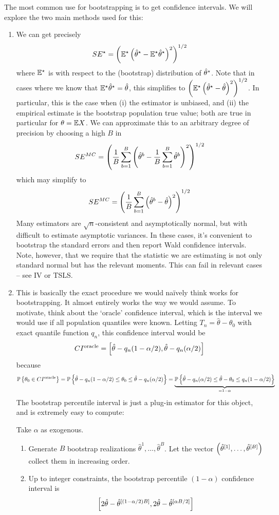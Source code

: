 \documentclass[10pt]{article}
\begin{document}
\begin{example}
	The most common use for bootstrapping is to get confidence intervals. We will explore the two main methods used for this:
	\begin{enumerate}
		\item {} We can get precisely \[SE^\star = \left( \mathbb{E}^\star\left( \hat{\theta}^\star - \mathbb{E}^\star  \hat{\theta}^\star\right)^2\right)^{1/2}\]where $\mathbb{E}^\star$ is with respect to the (bootstrap) distribution of $\hat{\theta}^\star$. Note that in cases where we know that $\mathbb{E}^\star\hat{\theta}^\star = \hat{\theta}$, this simplifies to $\left( \mathbb{E}^\star\left( \hat{\theta}^\star - \hat{\theta}\right)^2\right)^{1/2}$. In particular, this is the case when (i) the estimator is unbiased, and (ii) the empirical estimate is the bootstrap population true value; both are true in particular for $\theta = \mathbb{E} X$. We can approximate this to an arbitrary degree of precision by choosing a high $B$ in \[SE^{MC} = \left( \frac{1}{B}\sum_{b=1}^B \left( \hat{\theta}^b - \frac{1}{B}\sum_{b=1}^B \hat{\theta}^b\right)^2\right)^{1/2}\]which may simplify to \[SE^{MC} = \left( \frac{1}{B}\sum_{b=1}^B \left( \hat{\theta}^b - \hat{\theta}\right)^2\right)^{1/2}\]Many estimators are $\sqrt{n}$-consistent and asymptotically normal, but with difficult to estimate asymptotic variances. In these cases, it's convenient to bootstrap the standard errors and then report Wald confidence intervals. Note, however, that we require that the statistic we are estimating is not only standard normal but has the relevant moments. This can fail in relevant cases -- see IV or TSLS.
		\item {} This is basically the exact procedure we would na\"{i}vely think works for bootstrapping. It almost entirely works the way we would assume. To motivate, think about the `oracle' confidence interval, which is the interval we would use if all population quantiles were known. Letting $T_n = \hat{\theta}-\theta_0$ with exact quantile function $q_n$, this confidence interval would be \[CI^{\text{oracle}} = \left[ \hat{\theta}- q_n(1-\alpha/2),\hat{\theta} - q_n(\alpha / 2)\right]\]because\[\mathbb{P}\left\{\theta_0 \in CI^\text{oracle}\right\} = \mathbb{P}\left\{ \hat{\theta} - q_n(1-\alpha/2) \le \theta_0 \le \hat{\theta} - q_n(\alpha / 2)\right\} = \underbrace{\mathbb{P}\left\{ \hat{\theta} - q_n(\alpha/2) \le \hat{\theta}-\theta_0 \le q_n(1-\alpha/2)\right\}}_{=1-\alpha}\]The bootstrap percentile interval is just a plug-in estimator for this object, and is extremely easy to compute:\begin{algorithm} Take $\alpha$ as exogenous. \begin{enumerate} \item Generate $B$ bootstrap realizations $\hat{\theta}^1,\dots,\hat{\theta}^B$. Let the vector $\left( \hat{\theta}^{[1]},\dots,\hat{\theta}^{[B]}\right)$ collect them in increasing order. \item Up to integer constraints, the bootstrap percentile $(1-\alpha)$ confidence interval is \[\left[ 2\hat{\theta} - \hat{\theta}^{[(1-\alpha/2)B]}, 2\hat{\theta} - \hat{\theta}^{[\alpha B / 2]}\right]\]\end{enumerate}\end{algorithm}

\end{enumerate}
\end{example}
\end{document}
